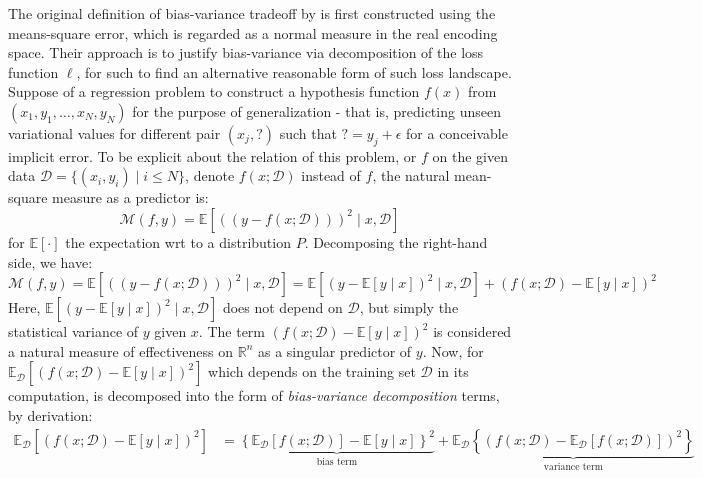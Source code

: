 The original definition of bias-variance tradeoff by \cite{6797087} is first constructed using the means-square error, which is regarded as a normal measure in the real encoding space. Their approach is to justify bias-variance via decomposition of the loss function $\ell$, for such to find an alternative reasonable form of such loss landscape. Suppose of a regression problem to construct a hypothesis function $f(x)$ from $(x_{1},y_{1},\dots,x_{N},y_{N})$ for the purpose of generalization - that is, predicting unseen variational values for different pair $(x_{j}, \mathord{?})$ such that $\mathord{?}=y_{j}+\epsilon$ for a conceivable implicit error. To be explicit about the relation of this problem, or $f$ on the given data $\mathcal{D}=\{(x_i, y_i)\mid i \leq N\}$, denote $f(x;\mathcal{D})$ instead of $f$, the natural mean-square measure as a predictor is: 
\begin{equation}
    \mathcal{M}(f,y) = \mathbb{E} \left[((y-f(x;\mathcal{D})))^{2}\mid x, \mathcal{D}\right] 
\end{equation} for $\mathbb{E}[\cdot]$ the expectation wrt to a distribution $P$. Decomposing the right-hand side, we have: 
\begin{equation}
    \mathcal{M}(f,y) = \mathbb{E} \left[((y-f(x;\mathcal{D})))^{2}\mid x, \mathcal{D}\right] = \mathbb{E}\left[(y-\mathbb{E}[y\mid x])^{2}\mid x,\mathcal{D}\right] + (f(x;\mathcal{D})-\mathbb{E}[y\mid x])^{2}
\end{equation}
Here, $\mathbb{E}\left[(y-\mathbb{E}[y\mid x])^{2}\mid x,\mathcal{D}\right]$ does not depend on $\mathcal{D}$, but simply the statistical variance of $y$ given $x$. The term $(f(x;\mathcal{D})-\mathbb{E}[y\mid x])^{2}$ is considered a natural measure of effectiveness on $\mathbb{R}^{n}$ as a singular predictor of $y$. Now, for $\mathbb{E}_{\mathcal{D}}\left[(f(x;\mathcal{D})-\mathbb{E}[y\mid x])^{2}\right]$ which depends on the training set $\mathcal{D}$ in its computation, is decomposed into the form of \textit{bias-variance decomposition} terms, by derivation: 
\begin{equation}
    \begin{split}
        \mathbb{E}_{\mathcal{D}} \left[(f(x;\mathcal{D})-\mathbb{E}[y\mid x])^{2}\right] & = \underbrace{\left\{ \mathbb{E}_{\mathcal{D}}[f(x;\mathcal{D})] - \mathbb{E}[y\mid x] \right\}^{2}}_{\text{bias term}} + \underbrace{\mathbb{E}_{\mathcal{D}} \left\{(f(x;\mathcal{D})- \mathbb{E}_{\mathcal{D}}[f(x;\mathcal{D})])^{2}\right\}}_{\text{variance term}}
    \end{split}
\end{equation}

